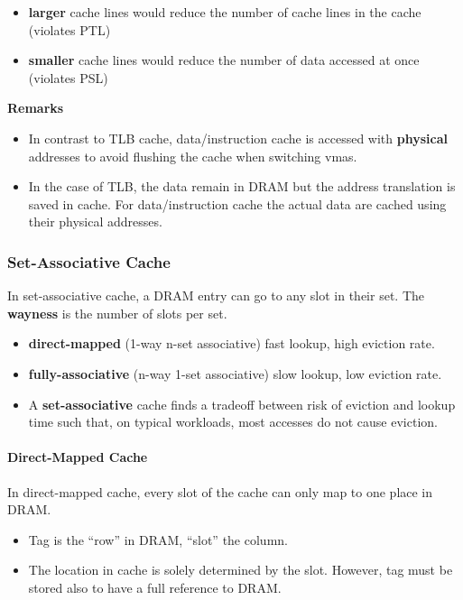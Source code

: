 \begin{itemize}
    \item \textbf{larger} cache lines would reduce the number of cache lines in the cache (violates PTL)
    \item \textbf{smaller} cache lines would reduce the number of data accessed at once (violates PSL)
\end{itemize}

\newpar{}
\textbf{Remarks}
\begin{itemize}
    \item In contrast to TLB cache, data/instruction cache is accessed with \textbf{physical} addresses to avoid flushing the cache when switching vmas.
    \item In the case of TLB, the data remain in DRAM but the address translation is saved in cache. For data/instruction cache the actual data are cached using their physical addresses.
\end{itemize}

\subsubsection{Set-Associative Cache}
In set-associative cache, a DRAM entry can go to any slot in their set. The \textbf{wayness} is the number of slots per set.

\begin{itemize}
    \item \textbf{direct-mapped} (1-way n-set associative) fast lookup, high eviction rate. 
    \item \textbf{fully-associative} (n-way 1-set associative) slow lookup, low eviction rate.
    \item A \textbf{set-associative} cache finds a tradeoff between risk of eviction and lookup time such that, on typical workloads, most accesses do not cause eviction.
\end{itemize}

\paragraph{Direct-Mapped Cache}
In direct-mapped cache, every slot of the cache can only map to one place in DRAM.
\begin{itemize}
    \item Tag is the ``row'' in DRAM, ``slot'' the column.
    \item The location in cache is solely determined by the slot. However, tag must be stored also to have a full reference to DRAM.
\end{itemize}

